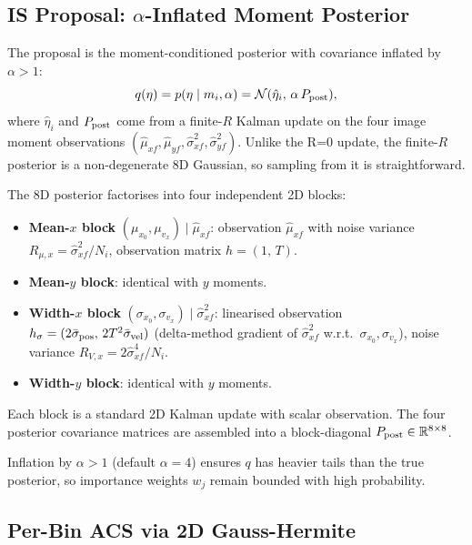 \documentclass[11pt,a4paper]{article}
\begin{document}
\subsection{IS Proposal: $\alpha$-Inflated Moment Posterior}

The proposal is the moment-conditioned posterior with covariance inflated
by $\alpha > 1$:
\begin{equation}
  q(\eta) = p(\eta \mid m_i,\alpha) = \mathcal{N}(\hat\eta_i,\, \alpha\, P_{\rm post}),
  \label{eq:proposal}
\end{equation}
where $\hat\eta_i$ and $P_{\rm post}$ come from a finite-$R$ Kalman
update on the four image moment observations
$(\hat\mu_{xf},\hat\mu_{yf},\hat\sigma^2_{xf},\hat\sigma^2_{yf})$.
Unlike the R=0 update, the finite-$R$ posterior is a non-degenerate 8D
Gaussian, so sampling from it is straightforward.

The 8D posterior factorises into four independent 2D blocks:
\begin{itemize}
  \item \textbf{Mean-$x$ block} $(\mu_{x_0}, \mu_{v_x}) \mid \hat\mu_{xf}$:
    observation $\hat\mu_{xf}$ with noise variance $R_{\mu,x} = \hat\sigma^2_{xf}/N_i$,
    observation matrix $h = (1,\, T)$.
  \item \textbf{Mean-$y$ block}: identical with $y$ moments.
  \item \textbf{Width-$x$ block} $(\sigma_{x_0}, \sigma_{v_x}) \mid \hat\sigma^2_{xf}$:
    linearised observation $h_\sigma = (2\bar\sigma_{\rm pos},\, 2T^2\bar\sigma_{\rm vel})$
    (delta-method gradient of $\hat\sigma^2_{xf}$ w.r.t.\ $\sigma_{x_0}, \sigma_{v_x}$),
    noise variance $R_{V,x} = 2\hat\sigma^4_{xf}/N_i$.
  \item \textbf{Width-$y$ block}: identical with $y$ moments.
\end{itemize}
Each block is a standard 2D Kalman update with scalar observation.  The
four posterior covariance matrices are assembled into a block-diagonal
$P_{\rm post}\in\mathbb{R}^{8\times8}$.

Inflation by $\alpha > 1$ (default $\alpha = 4$) ensures $q$ has heavier
tails than the true posterior, so importance weights $w_j$ remain bounded
with high probability.

\subsection{Per-Bin ACS via 2D Gauss-Hermite}
\end{document}
